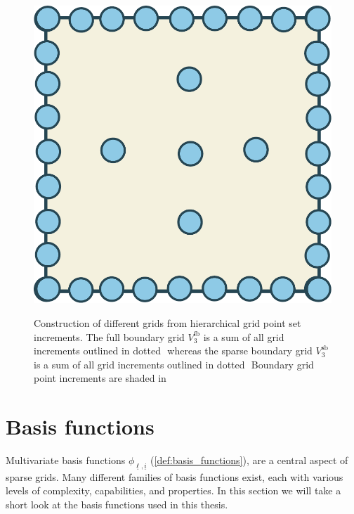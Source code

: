 \documentclass[
  a4paper,  %
  twoside,  %
  bibliography=totoc,
  headsepline,
  cleardoublepage=empty,
  parskip=half,
  draft=false
]{scrbook}
\begin{document}
\begin{mdframed}[style=style]
\begin{figure}[H]
\begin{minipage}{0.28\textwidth}
\label{fig:full_grid}
\vspace{4.5mm}
  \includegraphics[width=.8\linewidth]{graphics/sparse_grid}
\label{fig:sparse_grid}
\vspace{2.5mm}
    \end{minipage}
\delimit
\caption{Construction of different grids from hierarchical grid point set increments. The full boundary grid $V^{\text{fb}}_{3}$ is a sum of all grid increments outlined in dotted \greencomma\,\,whereas the sparse boundary grid $V^{\text{sb}}_{3}$ is a sum of all grid increments outlined in dotted \reddot\,\,Boundary grid point increments are shaded in \greydot}
\label{fig:grid_construction}
\end{figure}
\end{mdframed}

\section{Basis functions}

Multivariate basis functions $\phi_{\underline{\ell},\underline{i}}$ (\cref{def:basis_functions}), are a central aspect of sparse grids.
Many different families of basis functions exist, each with various levels of complexity, capabilities, and properties.
In this section we will take a short look at the basis functions used in this thesis.
\end{document}
